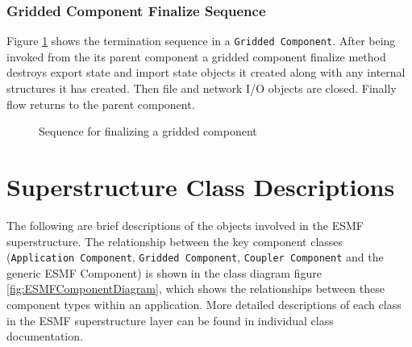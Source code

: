 \subsubsection{Gridded Component Finalize Sequence}
Figure \ref{fig:GriddedComponentFinalizeSequence} shows the termination 
sequence in a {\tt Gridded Component}. After being invoked from the
its parent component a gridded component finalize method destroys
export state and import state objects it created along with any
internal structures it has created. Then file and network I/O objects
are closed. Finally flow returns to the parent component.
\begin{figure}
\caption[{Gridded Component Finalize}]{Sequence for finalizing a gridded component}
\begin{center}
\label{fig:GriddedComponentFinalizeSequence}
\end{center}
\end{figure}

\section{Superstructure Class Descriptions}

The following are brief descriptions of the objects involved in the
ESMF superstructure. The relationship between the key component classes
({\tt Application Component}, {\tt Gridded Component}, {\tt Coupler Component} and the generic ESMF Component)
is shown in the 
class diagram figure \ref{fig:ESMFComponentDiagram}, which shows the relationships between these component 
types within an application. More detailed descriptions of each class 
in the ESMF superstructure layer can be found in individual class documentation.

